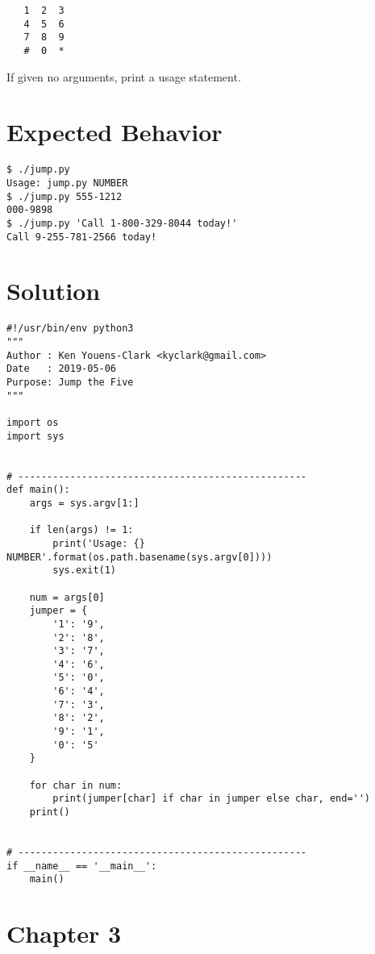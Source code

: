 \documentclass[]{article}
\begin{document}
\begin{verbatim}
   1  2  3
   4  5  6
   7  8  9
   #  0  *
\end{verbatim}

If given no arguments, print a usage statement.

\hypertarget{expected-behavior}{%
\section{Expected Behavior}\label{expected-behavior}}

\begin{verbatim}
$ ./jump.py
Usage: jump.py NUMBER
$ ./jump.py 555-1212
000-9898
$ ./jump.py 'Call 1-800-329-8044 today!'
Call 9-255-781-2566 today!
\end{verbatim}

\pagebreak

\hypertarget{solution-1}{%
\section{Solution}\label{solution-1}}

\begin{verbatim}
#!/usr/bin/env python3
"""
Author : Ken Youens-Clark <kyclark@gmail.com>
Date   : 2019-05-06
Purpose: Jump the Five
"""

import os
import sys


# --------------------------------------------------
def main():
    args = sys.argv[1:]

    if len(args) != 1:
        print('Usage: {} NUMBER'.format(os.path.basename(sys.argv[0])))
        sys.exit(1)

    num = args[0]
    jumper = {
        '1': '9',
        '2': '8',
        '3': '7',
        '4': '6',
        '5': '0',
        '6': '4',
        '7': '3',
        '8': '2',
        '9': '1',
        '0': '5'
    }

    for char in num:
        print(jumper[char] if char in jumper else char, end='')
    print()


# --------------------------------------------------
if __name__ == '__main__':
    main()
\end{verbatim}

\pagebreak

\hypertarget{chapter-3}{%
\section{Chapter 3}\label{chapter-3}}
\end{document}

